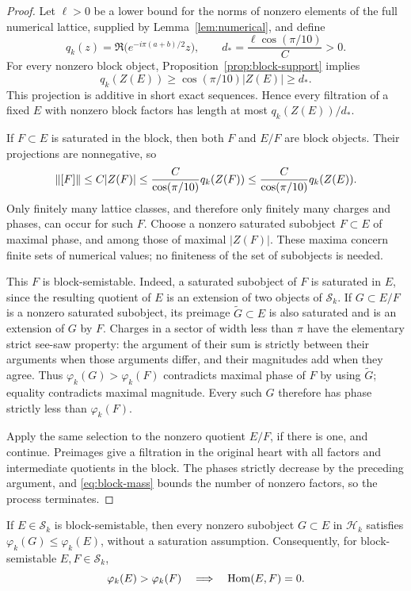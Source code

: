 \begin{proof}
Let $\ell>0$ be a lower bound for the norms of nonzero elements of the
full numerical lattice, supplied by Lemma~\ref{lem:numerical}, and define
\[
 q_k(z)=\Re\bigl(e^{-i\pi(a+b)/2}z\bigr),\qquad
 d_* =\frac{\ell\cos(\pi/10)}{C}>0.
\]
For every nonzero block object, Proposition~\ref{prop:block-support}
implies
\begin{equation}\label{eq:block-mass}
 q_k(Z(E))\ge\cos(\pi/10)|Z(E)|\ge d_*.
\end{equation}
This projection is additive in short exact sequences.  Hence every
filtration of a fixed $E$ with nonzero block factors has length at most
$q_k(Z(E))/d_*$.

If $F\subset E$ is saturated in the block, then both $F$ and $E/F$ are
block objects.  Their projections are nonnegative, so
\[
 \left\lVert[F]\right\rVert\le C|Z(F)|
 \le \frac{C}{\cos(\pi/10)}q_k(Z(F))
 \le \frac{C}{\cos(\pi/10)}q_k(Z(E)).
\]
Only finitely many lattice classes, and therefore only finitely many
charges and phases, can occur for such $F$.  Choose a nonzero saturated
subobject $F\subset E$ of maximal phase, and among those of maximal
$|Z(F)|$.  These maxima concern finite sets of numerical values; no
finiteness of the set of subobjects is needed.

This $F$ is block-semistable.  Indeed, a saturated subobject of $F$ is
saturated in $E$, since the resulting quotient of $E$ is an extension of
two objects of $\mathcal S_k$.  If $G\subset E/F$ is a nonzero saturated
subobject, its preimage $\widetilde G\subset E$ is also saturated and is
an extension of $G$ by $F$.  Charges in a sector of width less than $\pi$
have the elementary strict see-saw property: the argument of their sum
is strictly between their arguments when those arguments differ, and
their magnitudes add when they agree.  Thus
$\varphi_k(G)>\varphi_k(F)$ contradicts maximal phase of $F$ by using
$\widetilde G$; equality contradicts maximal magnitude.  Every such $G$
therefore has phase strictly less than $\varphi_k(F)$.

Apply the same selection to the nonzero quotient $E/F$, if there is one,
and continue.  Preimages give a filtration in the original heart with all
factors and intermediate quotients in the block.  The phases strictly
decrease by the preceding argument, and \eqref{eq:block-mass} bounds the
number of nonzero factors, so the process terminates.
\end{proof}

\begin{lemma}
\label{lem:block-hom}
If $E\in\mathcal S_k$ is block-semistable, then every nonzero subobject
$G\subset E$ in $\mathcal H_k$ satisfies
$\varphi_k(G)\le\varphi_k(E)$, without a saturation assumption.
Consequently, for block-semistable $E,F\in\mathcal S_k$,
\[
 \varphi_k(E)>\varphi_k(F)\quad\Longrightarrow\quad\operatorname{Hom}(E,F)=0.
\]
\end{lemma}

